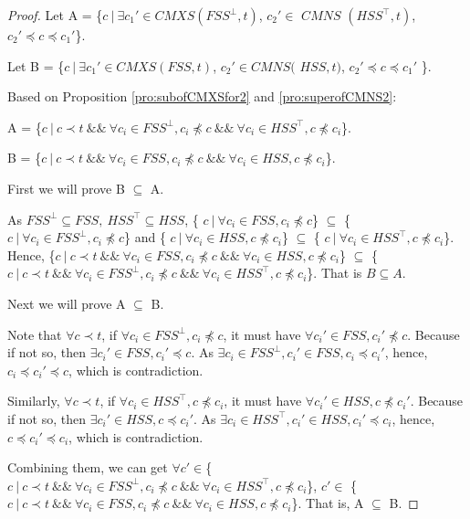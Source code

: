 {\begin{proof}
Let A = \{$ c\ |\ \exists c_{1}' \in CMXS(FSS^{\bot}, t)$, $c_{2}' \in $ $CMNS$ $(HSS^{\top}, t)$, $c_{2}' \preceq c \preceq c_{1}'$\}.


Let B =  \{$ c\ |\ \exists c_{1}' \in CMXS(FSS, t)$, $c_{2}' \in CMNS($ $HSS, t)$, $c_{2}' \preceq c \preceq c_{1}'$ \}.


Based on Proposition \ref{pro:subofCMXSfor2} and \ref{pro:superofCMNS2}:

A = \{$c\ |\ c \prec t\ \&\&\ \forall c_{i} \in FSS^{\bot}, c _{i} \npreceq c \ \&\&\  \forall c_{i} \in HSS^{\top}, c \npreceq c_{i}  $\}.

B = \{$c\ |\ c \prec t\ \&\&\ \forall c_{i} \in FSS, c _{i} \npreceq c \ \&\&\  \forall c_{i} \in HSS, c \npreceq c_{i}  $\}.


First we will prove B $\subseteq$ A.

As $FSS^{\bot} \subseteq FSS,\ HSS^{\top} \subseteq HSS$, \{ $c\ |\ \forall c_{i} \in FSS, c_{i} \npreceq c $\}  $\subseteq$  \{ $c\ |\ \forall c_{i} \in FSS^{\bot}, c_{i} \npreceq c $\} and \{ $c\ |\ \forall c_{i} \in HSS, c \npreceq c_{i} $\}  $\subseteq$  \{ $c\ |\ \forall c_{i} \in HSS^{\top}, c \npreceq c_{i} $\}. Hence, \{$c\ |\ c \prec t\ \&\&\ \forall c_{i} \in FSS, c _{i} \npreceq c \ \&\&\  \forall c_{i} \in HSS, c \npreceq c_{i}  $\}  $\subseteq$ \{$c\ |\ c \prec t\ \&\&\ \forall c_{i} \in FSS^{\bot}, c _{i} \npreceq c \ \&\&\  \forall c_{i} \in HSS^{\top}, c \npreceq c_{i}  $\}. That is  $B \subseteq A$.

Next we will prove A $\subseteq$ B.

Note that  $\forall c \prec t$, if $\forall c_{i} \in FSS^{\bot}, c_{i} \npreceq c$, it must have $\forall c_{i}' \in FSS, c_{i}' \npreceq c$. Because if not so, then $\exists c_{i}' \in FSS, c_{i}' \preceq c$. As $\exists c_{i} \in FSS^{\bot}, c_{i}' \in FSS, c_{i} \preceq c_{i}'$, hence, $c_{i} \preceq c_{i}' \preceq c$,  which is contradiction.

Similarly, $\forall c \prec t$, if $\forall c_{i} \in HSS^{\top}, c \npreceq c_{i}$, it must have $\forall c_{i}' \in HSS, c \npreceq c_{i}'$. Because if not so, then $\exists c_{i}' \in HSS, c \preceq c_{i}'$. As $\exists c_{i} \in HSS^{\top}, c_{i}' \in HSS, c_{i}' \preceq c_{i}$, hence, $c \preceq c_{i}' \preceq c_{i}$,  which is contradiction.

Combining them, we can get $\forall c' \in $\{$c\ |\ c \prec t\ \&\&\ \forall c_{i} \in FSS^{\bot}, c _{i} \npreceq c \ \&\&\  \forall c_{i} \in HSS^{\top}, c \npreceq c_{i}  $\}, $c' \in $ \{$c\ |\ c \prec t\ \&\&\ \forall c_{i} \in FSS, c _{i} \npreceq c \ \&\&\  \forall c_{i} \in HSS, c \npreceq c_{i}  $\}. That is, A $\subseteq$ B.


\end{proof}}
